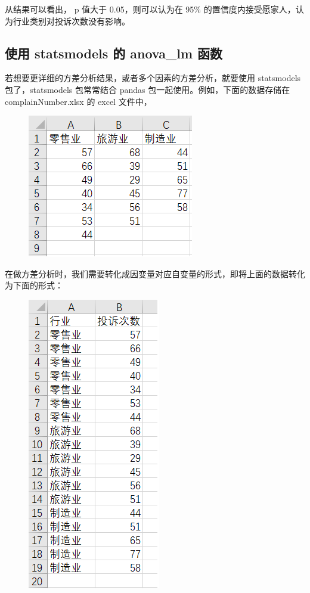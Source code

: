 从结果可以看出， p 值大于 0.05，则可以认为在 95\% 的置信度内接受愿家人，认为行业类别对投诉次数没有影响。

\subsection{使用 statsmodels 的 anova\_lm 函数}
若想要更详细的方差分析结果，或者多个因素的方差分析，就要使用 statsmodels 包了，statsmodels 包常常结合 pandas 包一起使用。例如，下面的数据存储在 complainNumber.xlsx 的 excel 文件中，

\begin{figure}[ht]
  \centering
  \includegraphics{figure/chapter3/complain.png}
\end{figure}

在做方差分析时，我们需要转化成因变量对应自变量的形式，即将上面的数据转化为下面的形式：

\begin{figure}[ht]
  \centering
  \includegraphics{figure/chapter3/complain2.png}
\end{figure}

